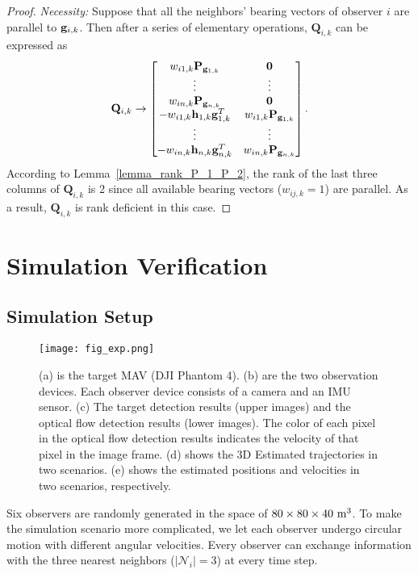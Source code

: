 \documentclass[letterpaper, 10 pt, conference]{ieeeconf}  %
\begin{document}
\begin{proof}
\emph{Necessity:}
Suppose that all the neighbors' bearing vectors of observer $i$ are parallel to $\mathbf{g}_{i,k}$. Then after a series of elementary operations, $\mathbf{Q}_{i,k}$ can be expressed as
\begin{align*}
\mathbf{Q}_{i,k} \rightarrow \begin{bmatrix}
w_{i1,k}\mathbf{P}_{\mathbf{g}_{1,k}} & \mathbf{0}\\
\vdots & \vdots\\
w_{in,k}\mathbf{P}_{\mathbf{g}_{n,k}} & \mathbf{0}\\
-w_{i1,k}\mathbf{h}_{1, k}\mathbf{g}^T_{1,k} & w_{i1,k}\mathbf{P}_{\mathbf{g}_{1,k}}\\
\vdots & \vdots\\
-w_{in,k}\mathbf{h}_{n, k}\mathbf{g}^T_{n,k} & w_{in,k}\mathbf{P}_{\mathbf{g}_{n,k}}
\end{bmatrix}.
\end{align*}
According to Lemma~\ref{lemma_rank_P_1_P_2}, the rank of the last three columns of $\mathbf{Q}_{i,k}$ is 2 since all available bearing vectors ($w_{ij,k}=1$) are parallel.
As a result, $\mathbf{Q}_{i,k}$ is rank deficient in this case.
\end{proof}

\section{Simulation Verification}\label{sec_sim}

\subsection{Simulation Setup}

\begin{figure*}
\centering
\texttt{[image: fig\_exp.png]}
\caption{(a) is the target MAV (DJI Phantom 4). (b) are the two observation devices. Each observer device consists of a camera and an IMU sensor. (c) The target detection results (upper images) and the optical flow detection results (lower images). The color of each pixel in the optical flow detection results indicates the velocity of that pixel in the image frame. (d) shows the 3D Estimated trajectories in two scenarios. (e) shows the estimated positions and velocities in two scenarios, respectively.}\label{fig_exp}
\end{figure*}

Six observers are randomly generated in the space of $80\times 80\times 40~{\rm m}^3$. To make the simulation scenario more complicated, we let each observer undergo circular motion with different angular velocities. Every observer can exchange information with the three nearest neighbors ($|\mathcal{N}_i|=3$) at every time step.
\end{document}
